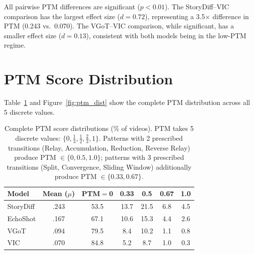 \documentclass[sigconf,review,anonymous]{acmart}
\begin{document}
All pairwise PTM differences are significant ($p < 0.01$).
The StoryDiff--VIC comparison has the largest effect size ($d = 0.72$), representing a 3.5$\times$ difference in PTM (0.243 vs.\ 0.070).
The VGoT--VIC comparison, while significant, has a smaller effect size ($d = 0.13$), consistent with both models being in the low-PTM regime.


\section{PTM Score Distribution}
\label{app:distributions}

Table~\ref{tab:ptm_dist} and Figure~\ref{fig:ptm_dist} show the complete PTM distribution across all 5 discrete values.
\begin{table}[H]
\caption{Complete PTM score distributions (\% of videos). PTM takes 5 discrete values: $\{0, \tfrac{1}{3}, \tfrac{1}{2}, \tfrac{2}{3}, 1\}$. Patterns with 2 prescribed transitions (Relay, Accumulation, Reduction, Reverse Relay) produce PTM $\in \{0, 0.5, 1.0\}$; patterns with 3 prescribed transitions (Split, Convergence, Sliding Window) additionally produce PTM $\in \{0.33, 0.67\}$.}
\label{tab:ptm_dist}
\centering
\small
\begin{tabular}{@{}l c ccccc@{}}
\toprule
Model & Mean ($\mu$) & PTM$=$0 & 0.33 & 0.5 & 0.67 & 1.0 \\
\midrule
StoryDiff    & .243 & 53.5 & 13.7 & 21.5 & 6.8 & 4.5 \\
EchoShot  & .167 & 67.1 & 10.6 & 15.3 & 4.4 & 2.6 \\
VGoT  & .094 & 79.5 &  8.4 & 10.2 & 1.1 & 0.8 \\
VIC   & .070 & 84.8 &  5.2 &  8.7 & 1.0 & 0.3 \\
\bottomrule
\end{tabular}
\end{table}
\end{document}
